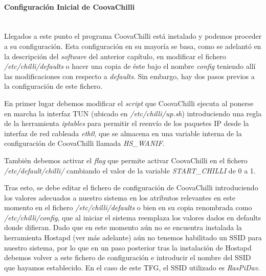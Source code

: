 \paragraph{Configuración Inicial de CoovaChilli} \label{CoovaConfig} ~\\

Llegados a este punto el programa CoovaChilli está instalado y podemos proceder a su configuración. Esta configuración en su mayoría se basa, como se adelantó en la descripción del \emph{software} del anterior capítulo, en modificar el fichero \emph{/etc/chilli/defaults} o hacer una copia de éste bajo el nombre \emph{config} teniendo allí las modificaciones con respecto a \emph{defaults}. Sin embargo, hay dos pasos previos a la configuración de este fichero.

En primer lugar debemos modificar el \emph{script} que CoovaChilli ejecuta al ponerse en marcha la interfaz TUN (ubicado en \emph{/etc/chilli/up.sh}) introduciendo una regla de la herramienta \emph{iptables} para permitir el reenvío de los paquetes IP desde la interfaz de red cableada \emph{eth0}, que se almacena en una variable interna de la configuración de CoovaChilli llamada \emph{HS\_WANIF}.


También debemos activar el \emph{flag} que permite activar CoovaChilli en el fichero \emph{/etc/default/chilli/} cambiando el valor de la variable \emph{START\_CHILLI} de 0 a 1.

Tras esto, se debe editar el fichero de configuración de CoovaChilli introduciendo los valores adecuados a nuestro sistema en los atributos relevantes en este momento en el fichero \emph{/etc/chilli/defaults} o bien en su copia renombrada como \emph{/etc/chilli/config}, que al iniciar el sistema reemplaza los valores dados en defaults donde difieran. Dado que en este momento aún no se encuentra instalada la herramienta Hostapd (ver más adelante) aún no tenemos habilitado un SSID para nuestro sistema, por lo que en un paso posterior tras la instalación de Hostapd debemos volver a este fichero de configuración e introducir el nombre del SSID que hayamos establecido. En el caso de este TFG, el SSID utilizado es \emph{RasPiDav}.


